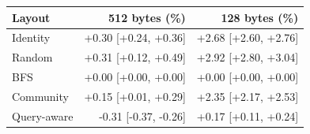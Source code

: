 \begin{tabular}{lrr}
\toprule
Layout & 512 bytes (\%) & 128 bytes (\%) \\
\midrule
Identity & +0.30 [+0.24, +0.36] & +2.68 [+2.60, +2.76] \\
Random & +0.31 [+0.12, +0.49] & +2.92 [+2.80, +3.04] \\
BFS & +0.00 [+0.00, +0.00] & +0.00 [+0.00, +0.00] \\
Community & +0.15 [+0.01, +0.29] & +2.35 [+2.17, +2.53] \\
Query-aware & -0.31 [-0.37, -0.26] & +0.17 [+0.11, +0.24] \\
\bottomrule
\end{tabular}
